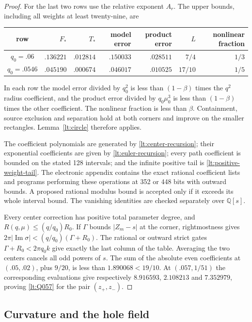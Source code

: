 \documentclass[11pt,reqno]{amsart}
\numberwithin{equation}{section}
\theoremstyle{definition}
\theoremstyle{remark}
\renewcommand{\Im}{\operatorname{Im}}
\begin{document}
\begin{proof}
For the last two rows use the relative exponent $A_r$.
The upper bounds, including all weights at least twenty-nine,
are
\begin{center}\small
\begin{tabular}{c|rrrrrr}
\toprule
row&$F_*$&$T_*$&model error&product error&$L$&nonlinear fraction\\\midrule
$q_0=.06$&$.136221$&$.012814$&$.150033$&$.028511$&$7/4$&$1/3$\\
$q_0=.0546$&$.045190$&$.000674$&$.046017$&$.010525$&$17/10$&$1/5$\\\bottomrule
\end{tabular}
\end{center}
In each row the model error divided by $q_0^2$ is less than
$(1-\beta)$ times the $q^2$ radius coefficient, and the product
error divided by $q_0\mu_0^3$ is less than $(1-\beta)$ times the
other coefficient. The nonlinear fraction is less than
$\beta$. Containment, source exclusion and separation hold at both
corners and improve on the smaller rectangles. Lemma~\ref{lt:circle}
therefore applies.

The coefficient polynomials are generated by
\eqref{lt:center-recursion}; their exponential coefficients are given
by \eqref{lt:euler-recursion}; every path coefficient is bounded on
the stated 128 intervals; and the infinite positive tail is
\eqref{lt:positive-weight-tail}. The electronic appendix contains the
exact rational coefficient lists and programs performing these
operations at 352 or 448 bits with outward bounds. A proposed rational
modulus bound is accepted only if it exceeds its whole interval bound.
The vanishing identities are checked separately over $\mathbb Q[s]$.

Every center correction has positive total parameter degree, and
$R(q,\mu)\le(q/q_0)R_0$. If $\Gamma$ bounds $|Z_m-s|$ at
the corner, rightmostness gives
$2\pi|\Im\sigma|<(q/q_0)(\Gamma+R_0)$.
The rational or outward strict gates
$\Gamma+R_0<2\pi q_0k$ give exactly the last column of the table.
Averaging the two centers cancels all odd powers of $s$. The sum of
the absolute even coefficients at $(.05,.02)$, plus $9/20$, is
less than $1.890068<19/10$. At $(.057,1/51)$ the corresponding
evaluations give respectively
$8.916593$, $2.108213$ and $7.352979$, proving
\eqref{lt:Q057} for the pair $(z_+,z_-)$.
\end{proof}

\subsection{Curvature and the hole field}
\end{document}
